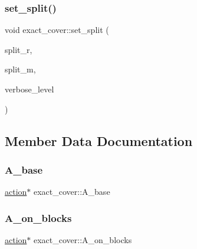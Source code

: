\mbox{\label{classexact__cover_a931a1b03aef6d50b927380425110992f}} 
\subsubsection{\texorpdfstring{set\+\_\+split()}{set\_split()}}
{\footnotesize\ttfamily void exact\+\_\+cover\+::set\+\_\+split (\begin{DoxyParamCaption}\item[{\mbox{\hyperlink{galois_8h_a09fddde158a3a20bd2dcadb609de11dc}{I\+NT}}}]{split\+\_\+r,  }\item[{\mbox{\hyperlink{galois_8h_a09fddde158a3a20bd2dcadb609de11dc}{I\+NT}}}]{split\+\_\+m,  }\item[{\mbox{\hyperlink{galois_8h_a09fddde158a3a20bd2dcadb609de11dc}{I\+NT}}}]{verbose\+\_\+level }\end{DoxyParamCaption})}



\subsection{Member Data Documentation}
\mbox{\label{classexact__cover_aed89508b38628ac50b3dde7dfede3ff9}} 
\subsubsection{\texorpdfstring{A\+\_\+base}{A\_base}}
{\footnotesize\ttfamily \mbox{\hyperlink{classaction}{action}}$\ast$ exact\+\_\+cover\+::\+A\+\_\+base}

\mbox{\label{classexact__cover_a4575200536fca630a03696141f78d367}} 
\subsubsection{\texorpdfstring{A\+\_\+on\+\_\+blocks}{A\_on\_blocks}}
{\footnotesize\ttfamily \mbox{\hyperlink{classaction}{action}}$\ast$ exact\+\_\+cover\+::\+A\+\_\+on\+\_\+blocks}

